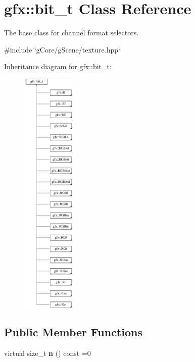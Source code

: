 \hypertarget{classgfx_1_1bit__t}{\section{gfx\-:\-:bit\-\_\-t Class Reference}
\label{classgfx_1_1bit__t}
}


The base class for channel format selectors.  




{\ttfamily \#include \char`\"{}g\-Core/g\-Scene/texture.\-hpp\char`\"{}}

Inheritance diagram for gfx\-:\-:bit\-\_\-t\-:\begin{figure}[H]
\begin{center}
\leavevmode
\includegraphics[height=12.000000cm]{classgfx_1_1bit__t}
\end{center}
\end{figure}
\subsection*{Public Member Functions}
\begin{DoxyCompactItemize}
\item 
\hypertarget{classgfx_1_1bit__t_a8d332ea709667a8f386f68391cdb0e44}{virtual size\-\_\-t {\bfseries n} () const =0}\label{classgfx_1_1bit__t_a8d332ea709667a8f386f68391cdb0e44}

\end{DoxyCompactItemize}


